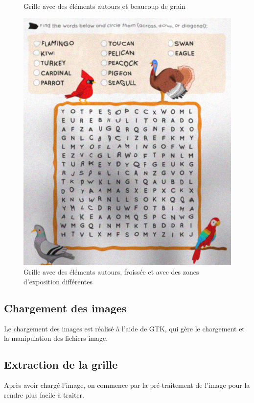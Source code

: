 \documentclass{article}
\begin{document}
\begin{figure}[!htb]
      \caption{Grille avec des éléments autours et beaucoup de grain}
    \endminipage\hfill
      \includegraphics[width=\linewidth]{ressources/image_3.png}
      \caption{Grille avec des éléments autours, froissée et avec des zones d'exposition différentes}
    \endminipage
\end{figure}


\subsection{Chargement des images}

Le chargement des images est réalisé à l'aide de GTK, qui gère le chargement et la manipulation des fichiers image.

\subsection{Extraction de la grille}

Après avoir chargé l'image, on commence par la pré-traitement de l'image pour la rendre plus facile à traiter.
\end{document}
